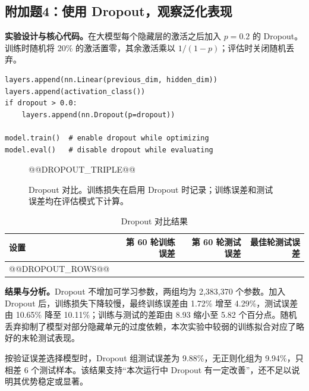 \documentclass[UTF8,11pt,a4paper,fontset=fandol]{ctexart}
\newcommand{\question}[1]{\Needspace{14\baselineskip}\subsection{#1}}
\begin{document}
\question{附加题4：使用 Dropout，观察泛化表现}
\textbf{实验设计与核心代码。}在大模型每个隐藏层的激活之后加入 $p=0.2$ 的 Dropout。训练时随机将 20\% 的激活置零，其余激活乘以 $1/(1-p)$；评估时关闭随机丢弃。
\par\noindent\begin{minipage}{\linewidth}
\begin{lstlisting}
layers.append(nn.Linear(previous_dim, hidden_dim))
layers.append(activation_class())
if dropout > 0.0:
    layers.append(nn.Dropout(p=dropout))

model.train()  # enable dropout while optimizing
model.eval()   # disable dropout while evaluating
\end{lstlisting}
\end{minipage}\par
\begin{figure}[H]\centering
@@DROPOUT_TRIPLE@@
\caption{Dropout 对比。训练损失在启用 Dropout 时记录；训练误差和测试误差均在评估模式下计算。}\label{fig:dropout}
\end{figure}
\begin{table}[H]\centering\small
\caption{Dropout 对比结果}
\begin{tabular}{lrrr}\toprule
设置 & 第 60 轮训练误差 & 第 60 轮测试误差 & 最佳轮测试误差 \\\midrule
@@DROPOUT_ROWS@@
\bottomrule\end{tabular}
\end{table}
\textbf{结果与分析。}Dropout 不增加可学习参数，两组均为 2,383,370 个参数。加入 Dropout 后，训练损失下降较慢，最终训练误差由 1.72\% 增至 4.29\%，测试误差由 10.65\% 降至 10.11\%；训练与测试的差距由 8.93 缩小至 5.82 个百分点。随机丢弃抑制了模型对部分隐藏单元的过度依赖，本次实验中较弱的训练拟合对应了略好的末轮测试表现。

按验证误差选择模型时，Dropout 组测试误差为 9.88\%，无正则化组为 9.94\%，只相差 6 个测试样本。该结果支持“本次运行中 Dropout 有一定改善”，还不足以说明其优势稳定或显著。
\end{document}
